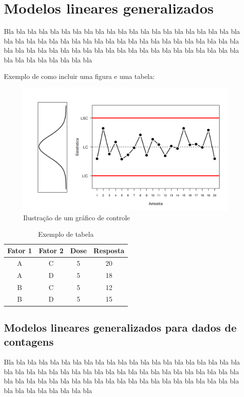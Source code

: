 \documentclass[
	article,			%
	12pt,				%
	oneside,			%
	a4paper,			%
	english,			%
	brazil,				%
	sumario=tradicional
	]{abntex2}
\begin{document}

\section{Modelos lineares generalizados}
Bla bla bla bla bla bla bla bla bla bla bla bla bla bla bla bla bla bla bla bla bla bla bla bla bla bla bla bla bla bla bla bla bla bla bla bla bla bla bla bla bla bla bla bla bla bla bla bla bla bla bla bla bla bla bla bla bla bla bla bla bla bla bla bla bla bla bla bla bla bla bla

Exemplo de como incluir uma figura e uma tabela:

\begin{figure}[ht]
    \includegraphics[scale=0.70]{GrafControle.png}
    \caption{Ilustração de um gráfico de controle}
    \label{Fig1}
    \centering
\end{figure}

\begin{table}[]
\center
\caption{Exemplo de tabela}
\begin{tabular}{cccc}
\hline
Fator 1 & Fator 2 & Dose & Resposta \\ \hline
A & C & 5 & 20 \\
A & D & 5 & 18 \\
B & C & 5 & 12 \\
B & D & 5 & 15 \\ \hline
\end{tabular}
\end{table}

\subsection{Modelos lineares generalizados para dados de contagens}
Bla bla bla bla bla bla bla bla bla bla bla bla bla bla bla bla bla bla bla bla bla bla bla bla bla bla bla bla bla bla bla bla bla bla bla bla bla bla bla bla bla bla bla bla bla bla bla bla bla bla bla bla bla bla bla bla bla bla bla bla bla bla bla bla bla bla bla bla bla bla bla
\end{document}
